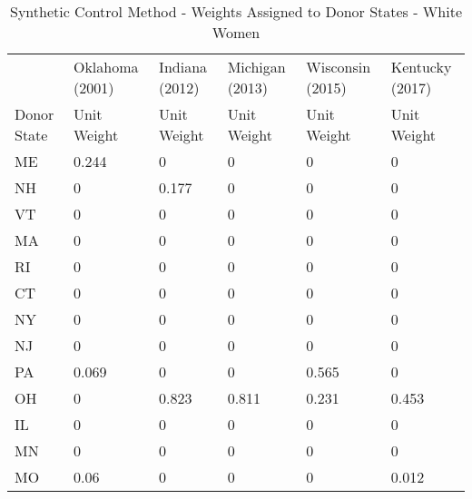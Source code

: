 \begin{table}[ht!]\centering
\caption{Synthetic Control Method - Weights Assigned to Donor States - White Women}\label{tab:donor_weights_wf}
\fontsize{10}{11}\selectfont
\begin{tabular}{llllll}
            &                 &                &                 &                  &                 \\
            \hline\hline
            & Oklahoma (2001) & Indiana (2012) & Michigan (2013) & Wisconsin (2015) & Kentucky (2017) \\
            \hline
Donor State & Unit Weight     & Unit Weight    & Unit Weight     & Unit Weight      & Unit Weight     \\
\hline
ME          & 0.244           & 0              & 0               & 0                & 0               \\
NH          & 0               & 0.177          & 0               & 0                & 0               \\
VT          & 0               & 0              & 0               & 0                & 0               \\
MA          & 0               & 0              & 0               & 0                & 0               \\
RI          & 0               & 0              & 0               & 0                & 0               \\
CT          & 0               & 0              & 0               & 0                & 0               \\
NY          & 0               & 0              & 0               & 0                & 0               \\
NJ          & 0               & 0              & 0               & 0                & 0               \\
PA          & 0.069           & 0              & 0               & 0.565            & 0               \\
OH          & 0               & 0.823          & 0.811           & 0.231            & 0.453           \\
IL          & 0               & 0              & 0               & 0                & 0               \\
MN          & 0               & 0              & 0               & 0                & 0               \\
MO          & 0.06            & 0              & 0               & 0                & 0.012           \\

\end{tabular}
\end{table}
